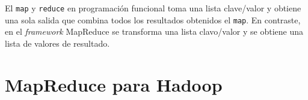 \documentclass[conference]{IEEEtran}
\begin{document}





El \texttt{map} y \texttt{reduce} en programación funcional toma una lista clave/valor y obtiene una sola salida que combina todos los resultados obtenidos el \texttt{map}.
En contraste, en el \textit{framework} MapReduce se transforma una lista clavo/valor y se obtiene una lista de valores de resultado.








\section{MapReduce para Hadoop}
\label{hadoop}
\end{document}
